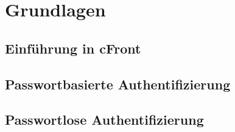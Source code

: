 \chapter{Grundlagen}

\section{Einführung in cFront}

\section{Passwortbasierte Authentifizierung}

\section{Passwortlose Authentifizierung}